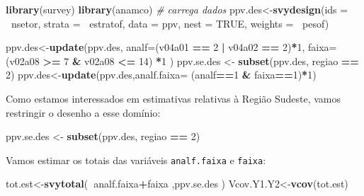 \documentclass[]{book}
\newenvironment{Shaded}{\begin{snugshade}}{\end{snugshade}}
\newcommand{\KeywordTok}[1]{\textcolor[rgb]{0.13,0.29,0.53}{\textbf{#1}}}
\newcommand{\DataTypeTok}[1]{\textcolor[rgb]{0.13,0.29,0.53}{#1}}
\newcommand{\DecValTok}[1]{\textcolor[rgb]{0.00,0.00,0.81}{#1}}
\newcommand{\StringTok}[1]{\textcolor[rgb]{0.31,0.60,0.02}{#1}}
\newcommand{\CommentTok}[1]{\textcolor[rgb]{0.56,0.35,0.01}{\textit{#1}}}
\newcommand{\OtherTok}[1]{\textcolor[rgb]{0.56,0.35,0.01}{#1}}
\newcommand{\OperatorTok}[1]{\textcolor[rgb]{0.81,0.36,0.00}{\textbf{#1}}}
\newcommand{\NormalTok}[1]{#1}
\theoremstyle{definition}
\theoremstyle{definition}
\theoremstyle{definition}
\theoremstyle{remark}
\begin{document}
\begin{Shaded}
\begin{Highlighting}[]
\KeywordTok{library}\NormalTok{(survey)}
\KeywordTok{library}\NormalTok{(anamco) }\CommentTok{# carrega dados}
\NormalTok{ppv.des<-}\KeywordTok{svydesign}\NormalTok{(}\DataTypeTok{ids =} \OperatorTok{~}\NormalTok{nsetor, }\DataTypeTok{strata =} \OperatorTok{~}\NormalTok{estratof,}
\DataTypeTok{data =}\NormalTok{ ppv, }\DataTypeTok{nest =} \OtherTok{TRUE}\NormalTok{, }\DataTypeTok{weights =} \OperatorTok{~}\NormalTok{pesof)}

\NormalTok{ppv.des<-}\KeywordTok{update}\NormalTok{(ppv.des,}
  \DataTypeTok{analf=}\NormalTok{(v04a01 }\OperatorTok{==}\StringTok{ }\DecValTok{2} \OperatorTok{|}\StringTok{ }\NormalTok{v04a02 }\OperatorTok{==}\StringTok{ }\DecValTok{2}\NormalTok{)}\OperatorTok{*}\DecValTok{1}\NormalTok{,}
  \DataTypeTok{faixa=}\NormalTok{(v02a08 }\OperatorTok{>=}\StringTok{ }\DecValTok{7} \OperatorTok{&}\StringTok{ }\NormalTok{v02a08 }\OperatorTok{<=}\StringTok{ }\DecValTok{14}\NormalTok{) }\OperatorTok{*}\DecValTok{1}
\NormalTok{)}
\NormalTok{ppv.se.des <-}\StringTok{ }\KeywordTok{subset}\NormalTok{(ppv.des, regiao }\OperatorTok{==}\StringTok{ }\DecValTok{2}\NormalTok{)}
\NormalTok{ppv.des<-}\KeywordTok{update}\NormalTok{(ppv.des,}\DataTypeTok{analf.faixa=}\NormalTok{ (analf}\OperatorTok{==}\DecValTok{1} \OperatorTok{&}\StringTok{ }\NormalTok{faixa}\OperatorTok{==}\DecValTok{1}\NormalTok{)}\OperatorTok{*}\DecValTok{1}\NormalTok{)}
\end{Highlighting}
\end{Shaded}

Como estamos interessados em estimativas relativas à Região Sudeste,
vamos restringir o desenho a esse domínio:

\begin{Shaded}
\begin{Highlighting}[]
\NormalTok{ppv.se.des <-}\StringTok{ }\KeywordTok{subset}\NormalTok{(ppv.des, regiao }\OperatorTok{==}\StringTok{ }\DecValTok{2}\NormalTok{)}
\end{Highlighting}
\end{Shaded}

Vamos estimar os totais das variáveis \texttt{analf.faixa} e
\texttt{faixa}:

\begin{Shaded}
\begin{Highlighting}[]
\NormalTok{tot.est<-}\KeywordTok{svytotal}\NormalTok{(}\OperatorTok{~}\NormalTok{analf.faixa}\OperatorTok{+}\NormalTok{faixa ,ppv.se.des )}
\NormalTok{Vcov.Y1.Y2<-}\KeywordTok{vcov}\NormalTok{(tot.est) }
\end{Highlighting}
\end{Shaded}
\end{document}
